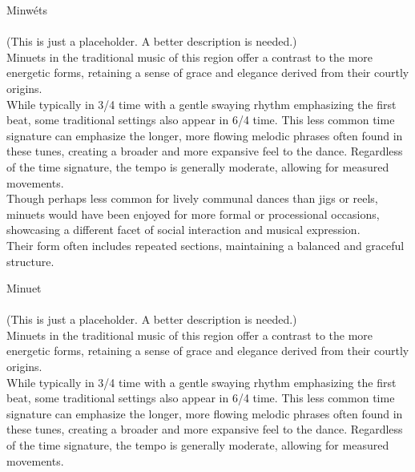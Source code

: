 \begin{multicols}{2}
    \Huge{Minwéts}\\
    \vspace{1cm}\\
    \normalsize{
      \noindent 
      (This is just a placeholder. A better description is needed.)\\

      Minuets in the traditional music of this region offer a contrast to the more 
      energetic forms, retaining a sense of grace and elegance derived from 
      their courtly origins.\\
      
      While typically in 3/4 time with a gentle swaying rhythm emphasizing the first beat, 
      some traditional settings also appear in 6/4 time. This less common time signature 
      can emphasize the longer, more flowing melodic phrases often found in these tunes, 
      creating a broader and more expansive feel to the dance. Regardless of the time 
      signature, the tempo is generally moderate, allowing for measured movements.\\ 
      
      Though perhaps less common for lively communal dances than jigs or reels, 
      minuets would have been enjoyed for more formal or processional occasions, 
      showcasing a different facet of social interaction and musical expression.\\ 
      
      Their form often includes repeated sections, maintaining a balanced and graceful structure.
    }

    \newcolumn

    \Huge{Minuet}\\
    \vspace{1cm}\\
    \normalsize{
      \noindent
      (This is just a placeholder. A better description is needed.)\\

      Minuets in the traditional music of this region offer a contrast to the more 
      energetic forms, retaining a sense of grace and elegance derived from 
      their courtly origins.\\
      
      While typically in 3/4 time with a gentle swaying rhythm emphasizing the first beat, 
      some traditional settings also appear in 6/4 time. This less common time signature 
      can emphasize the longer, more flowing melodic phrases often found in these tunes, 
      creating a broader and more expansive feel to the dance. Regardless of the time 
      signature, the tempo is generally moderate, allowing for measured movements.\\ 
      
}
\end{multicols}
